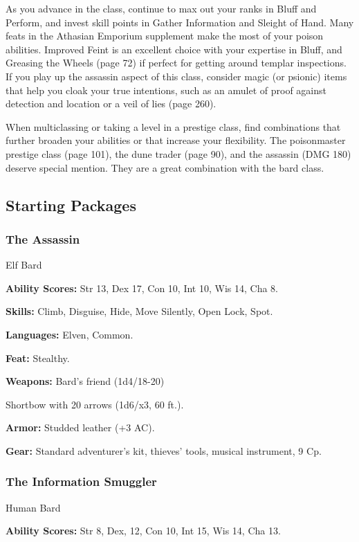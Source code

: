 As you advance in the class, continue to max out your ranks in Bluff and Perform, and invest skill points in Gather Information and Sleight of Hand. Many feats in the Athasian Emporium supplement make the most of your poison abilities. Improved Feint is an excellent choice with your expertise in Bluff, and Greasing the Wheels (page 72) if perfect for getting around templar inspections. If you play up the assassin aspect of this class, consider magic (or psionic) items that help you cloak your true intentions, such as an amulet of proof against detection and location or a veil of lies (page 260).

When multiclassing or taking a level in a prestige class, find combinations that further broaden your abilities or that increase your flexibility. The poisonmaster prestige class (page 101), the dune trader (page 90), and the assassin (DMG 180) deserve special mention. They are a great combination with the bard class.

\subsection{Starting Packages}
\subsubsection{The Assassin}

Elf Bard

\textbf{Ability Scores:} Str 13, Dex 17, Con 10, Int 10, Wis 14, Cha 8.

\textbf{Skills:} Climb, Disguise, Hide, Move Silently, Open Lock, Spot.

\textbf{Languages:} Elven, Common.

\textbf{Feat:} Stealthy.

\textbf{Weapons:} Bard's friend (1d4/18-20)

Shortbow with 20 arrows (1d6/x3, 60 ft.).

\textbf{Armor:} Studded leather (+3 AC).

\textbf{Gear:} Standard adventurer's kit, thieves' tools, musical instrument, 9 Cp.

\subsubsection{The Information Smuggler}

Human Bard

\textbf{Ability Scores:} Str 8, Dex, 12, Con 10, Int 15, Wis 14, Cha 13.

